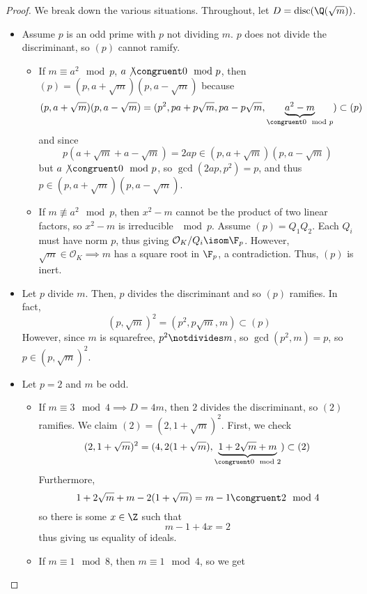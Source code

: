 \documentclass[11pt,leqno,oneside]{amsart}
\numberwithin{thm}{section}
\renewcommand{\O}{\mathcal{O}}
\newcommand{\disc}{\operatorname{disc}}
\begin{document}
\begin{proof}
  We break down the various situations. Throughout, let \(D =
  \disc(\Q(\sqrt{m}))\). 
  \begin{itemize}
  \item Assume \(p\) is an odd prime with \(p\) not dividing
    \(m\). \(p\) does not divide the discriminant, so \((p)\) cannot
      ramify.
    \begin{itemize}
    \item If \(m \equiv a^2 \mod p\), \(a \not \congruent 0 \mod p\),
      then \((p) = 
      (p,a+\sqrt{m})(p,a-\sqrt{m})\) because \[
        (p,a+\sqrt{m})(p,a-\sqrt{m}) = (p^2,
        pa+p\sqrt{m},pa-p\sqrt{m},\underbrace{a^2-m}_{\congruent 0
          \mod p}) \subset (p)
      \]
      and since \[
        p(a+\sqrt{m}+a-\sqrt{m}) = 2ap \in (p,a+\sqrt{m})(p,a-\sqrt{m})
      \]
      but \(a \not\congruent 0 \mod p\), so \(\gcd(2ap, p^2) = p\),
      and thus \(p \in (p,a+\sqrt{m})(p,a-\sqrt{m})\).
    \item If \(m \not \equiv a^2 \mod p\), then \(x^2-m\) cannot be
      the product of two linear factors, so \(x^2-m\) is irreducible
      \(\mod p\). Assume \((p) = Q_1Q_2\). Each \(Q_i\) must have norm
      \(p\), thus giving \(\O_K/Q_i \isom \F_p\). However, \(\sqrt{m} \in
      \O_K \implies m\) has a square root in \(\F_p\), a
      contradiction. Thus, \((p)\) is inert.
    \end{itemize}
  \item Let \(p\) divide \(m\). Then, \(p\) divides the discriminant
    and so \((p)\) ramifies. In fact, \[
      (p,\sqrt{m})^2 = (p^2, p\sqrt{m},m) \subset (p)
    \]
    However, since \(m\) is squarefree, \(p^2 \notdivides m\), so
    \(\gcd(p^2,m) = p\), so \(p \in (p,\sqrt{m})^2\).
  \item Let \(p=2\) and \(m\) be odd.
  \begin{itemize}
    \item If \(m \equiv 3 \mod 4 
      \implies D=4m\), then \(2\) divides the 
      discriminant, so \((2)\) ramifies. We claim \((2) =
      (2,1+\sqrt{m})^2\). First, we check \[
        (2,1+\sqrt{m})^2 =
        (4,2(1+\sqrt{m}),\underbrace{1+2\sqrt{m}+m}_{\congruent 0 \mod
        2}) \subset (2)
    \]
    Furthermore, \[
      1+2\sqrt{m}+m-2(1+\sqrt{m}) = m-1 \congruent 2 \mod 4
    \]
    so there is some \(x \in \Z\) such that \[
      m-1+4x = 2
    \]
    thus giving us equality of ideals.
    \item If \(m \equiv 1 \mod 8\), then \(m
      \equiv 1 \mod 4\), so we get 

\end{itemize}
\end{itemize}
\end{proof}
\end{document}
